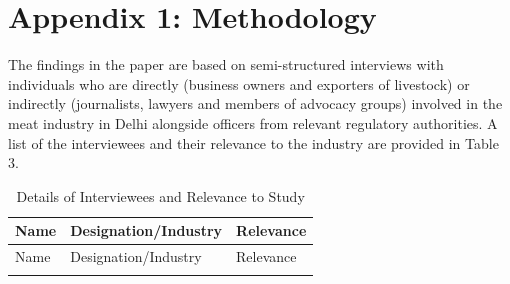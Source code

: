 \documentclass[a4paper, 12pt]{article}
\begin{document}
\section*{Appendix 1: Methodology}
The findings in the paper are based on semi-structured interviews with individuals who are directly (business owners and exporters of livestock) or indirectly (journalists, lawyers and members of advocacy groups) involved in the meat industry in Delhi alongside officers from relevant regulatory authorities. A list of the interviewees and their relevance to the industry are provided in Table 3. 
\footnotesize
 \begin{longtable}{>{\raggedright}p{2cm}>{\raggedright}p{5cm}>{\raggedright\arraybackslash}p{7.5cm}}
\caption{Details of Interviewees and Relevance to Study} \\
\toprule
Name & Designation/Industry & Relevance \\
\midrule
\endfirsthead
\midrule
Name & Designation/Industry & Relevance \\
\midrule
\endhead
\endlastfoot
   

\end{longtable}
\end{document}
